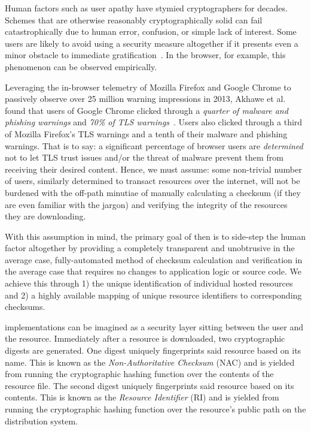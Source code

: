 Human factors such as user apathy have stymied cryptographers for decades.
Schemes that are otherwise reasonably cryptographically solid can fail
catastrophically due to human error, confusion, or simple lack of interest. Some
users are likely to avoid using a security measure altogether if it presents
even a minor obstacle to immediate gratification~\cite{Clickthrough, PGPBad}. In
the browser, for example, this phenomenon can be observed empirically.


Leveraging the in-browser telemetry of Mozilla Firefox and Google Chrome to
passively observe over 25 million warning impressions in 2013, Akhawe et al.
found that users of Google Chrome clicked through a \emph{quarter of malware and
phishing warnings} and \emph{70\% of TLS warnings}~\cite{Clickthrough}. Users
also clicked through a third of Mozilla Firefox's TLS warnings and a tenth of
their malware and phishing warnings. That is to say: a significant percentage of
browser users are \emph{determined} not to let TLS trust issues and/or the
threat of malware prevent them from receiving their desired content. Hence, we
must assume: some non-trivial number of users, similarly determined to transact
resources over the internet, will not be burdened with the off-path minutiae of
manually calculating a checksum (if they are even familiar with the jargon) and
verifying the integrity of the resources they are downloading.

With this assumption in mind, the primary goal of \SYSTEM{} then is to side-step
the human factor altogether by providing a completely transparent and
unobtrusive in the average case, fully-automated method of checksum calculation
and verification in the average case that requires no changes to application
logic or source code. We achieve this through 1) the unique identification of
individual hosted resources and 2) a highly available mapping of unique resource
identifiers to corresponding checksums.

\SYSTEM{} implementations can be imagined as a security layer sitting between
the user and the resource. Immediately after a resource is downloaded, two
cryptographic digests are generated. One digest uniquely fingerprints said
resource based on its name. This is known as the \emph{Non-Authoritative
Checksum} (NAC) and is yielded from running the cryptographic hashing function
over the contents of the resource file. The second digest uniquely fingerprints
said resource based on its contents. This is known as the \emph{Resource
Identifier} (RI) and is yielded from running the cryptographic hashing function
over the resource's public path on the distribution system.

